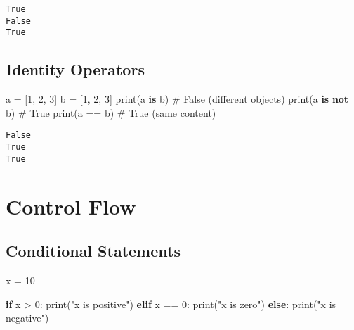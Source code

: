 \documentclass[
  letterpaper,
  DIV=11,
  numbers=noendperiod]{scrreprt}
\newenvironment{Shaded}{\begin{snugshade}}{\end{snugshade}}
\newcommand{\BuiltInTok}[1]{\textcolor[rgb]{0.00,0.23,0.31}{#1}}
\newcommand{\CommentTok}[1]{\textcolor[rgb]{0.37,0.37,0.37}{#1}}
\newcommand{\ControlFlowTok}[1]{\textcolor[rgb]{0.00,0.23,0.31}{\textbf{#1}}}
\newcommand{\DecValTok}[1]{\textcolor[rgb]{0.68,0.00,0.00}{#1}}
\newcommand{\KeywordTok}[1]{\textcolor[rgb]{0.00,0.23,0.31}{\textbf{#1}}}
\newcommand{\NormalTok}[1]{\textcolor[rgb]{0.00,0.23,0.31}{#1}}
\newcommand{\OperatorTok}[1]{\textcolor[rgb]{0.37,0.37,0.37}{#1}}
\newcommand{\StringTok}[1]{\textcolor[rgb]{0.13,0.47,0.30}{#1}}
\begin{document}
\begin{verbatim}
True
False
True
\end{verbatim}

\subsection{Identity Operators}\label{identity-operators}

\begin{Shaded}
\begin{Highlighting}[]
\NormalTok{a }\OperatorTok{=}\NormalTok{ [}\DecValTok{1}\NormalTok{, }\DecValTok{2}\NormalTok{, }\DecValTok{3}\NormalTok{]}
\NormalTok{b }\OperatorTok{=}\NormalTok{ [}\DecValTok{1}\NormalTok{, }\DecValTok{2}\NormalTok{, }\DecValTok{3}\NormalTok{]}
\BuiltInTok{print}\NormalTok{(a }\KeywordTok{is}\NormalTok{ b)      }\CommentTok{\# False (different objects)}
\BuiltInTok{print}\NormalTok{(a }\KeywordTok{is} \KeywordTok{not}\NormalTok{ b)  }\CommentTok{\# True}
\BuiltInTok{print}\NormalTok{(a }\OperatorTok{==}\NormalTok{ b)      }\CommentTok{\# True (same content)}
\end{Highlighting}
\end{Shaded}

\begin{verbatim}
False
True
True
\end{verbatim}

\section{Control Flow}\label{control-flow}

\subsection{Conditional Statements}\label{conditional-statements-1}

\begin{Shaded}
\begin{Highlighting}[]
\NormalTok{x }\OperatorTok{=} \DecValTok{10}

\ControlFlowTok{if}\NormalTok{ x }\OperatorTok{\textgreater{}} \DecValTok{0}\NormalTok{:}
    \BuiltInTok{print}\NormalTok{(}\StringTok{"x is positive"}\NormalTok{)}
\ControlFlowTok{elif}\NormalTok{ x }\OperatorTok{==} \DecValTok{0}\NormalTok{:}
    \BuiltInTok{print}\NormalTok{(}\StringTok{"x is zero"}\NormalTok{)}
\ControlFlowTok{else}\NormalTok{:}
    \BuiltInTok{print}\NormalTok{(}\StringTok{"x is negative"}\NormalTok{)}
\end{Highlighting}
\end{Shaded}
\end{document}
